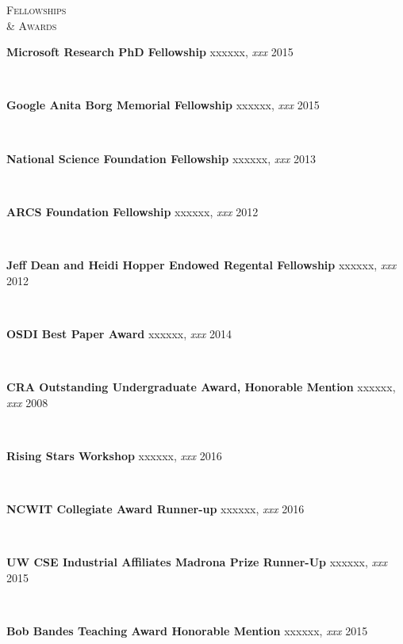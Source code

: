\documentclass[10pt,minionpro]{report}
\newlength{\sectiongap}
\newlength{\entrygap}
\newlength{\sectioncolwidth}
\newlength{\colgap}
\newlength{\stuffwidth}
\def\ifEqString#1#2{\def\testa{#1}\def\testb{#2}%
  \ifx\testa\testb}
\newenvironment{rtable}{
  \begin{minipage}{\textwidth}
  }{
  \end{minipage}
}
\newenvironment{rentry}[3][xxx]{
  \begin{minipage}[t]{\hsize}
    \textbf{#2}\ifEqString{#1}{xxx}\relax\else, \textit{#1}\fi
    \hspace{\stretch{1}} #3 \\
  }{
    \removelastskip
  \end{minipage}
  \\[\entrygap]  %
}
\newenvironment{rsection}[1]{
  \begin{minipage}[t]{\sectioncolwidth}
    \textsc{#1}
  \end{minipage}
  \hspace{\colgap}
  \begin{minipage}[t]{\stuffwidth}
  }{
    \removelastskip
  \end{minipage}
  \\[\sectiongap]
}
\begin{document}
\begin{rtable}
  \begin{rsection}{Fellowships\\\& Awards}
    \begin{rentry}{Microsoft Research PhD Fellowship}{2015}
      \vspace{-0.75em}
    \end{rentry} 
    \begin{rentry}{Google Anita Borg Memorial Fellowship}{2015}
      \vspace{-0.75em}
    \end{rentry} 
    \begin{rentry}{National Science Foundation Fellowship}{2013}
      \vspace{-0.75em}
    \end{rentry}
    \begin{rentry}{ARCS Foundation Fellowship}{2012}
       \vspace{-0.75em}
    \end{rentry}
    \begin{rentry}{Jeff Dean and Heidi Hopper Endowed Regental Fellowship}{2012}
       \vspace{-0.75em}
    \end{rentry}
    \begin{rentry}{OSDI Best Paper Award}{2014}
      \vspace{-0.75em}
    \end{rentry}
    \begin{rentry}{CRA Outstanding Undergraduate Award, Honorable
      Mention}{2008}
    \vspace{-0.75em}
    \end{rentry}
    \begin{rentry}{Rising Stars Workshop}{2016}
      \vspace{-0.75em}
    \end{rentry} 
    \begin{rentry}{NCWIT Collegiate Award Runner-up}{2016}
      \vspace{-0.75em}
    \end{rentry} 
    \begin{rentry}{UW CSE Industrial Affiliates Madrona Prize Runner-Up}{2015}
     \vspace{-0.75em}
    \end{rentry} 
    \begin{rentry}{Bob Bandes Teaching Award Honorable Mention}{2015}
      \vspace{-0.75em}
    \end{rentry} 

\end{rsection}
\end{rtable}
\end{document}
